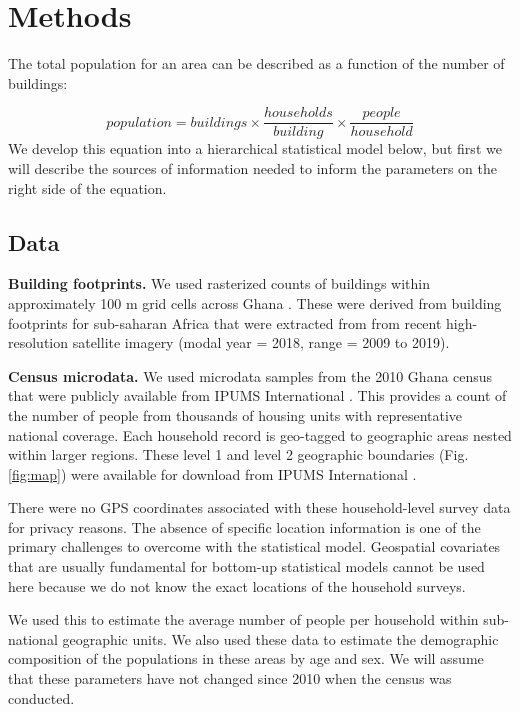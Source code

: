 \documentclass[]{book}
\begin{document}
\section{Methods}\label{methods}

The total population for an area can be described as a function of the
number of buildings:

\[
population = buildings \times \frac{households}{building} \times \frac{people}{household}
\] We develop this equation into a hierarchical statistical model below,
but first we will describe the sources of information needed to inform
the parameters on the right side of the equation.

\subsection{Data}\label{data}

\textbf{Building footprints.} We used rasterized counts of buildings
within approximately 100 m grid cells across Ghana
\citep{dooley2020gridded}. These were derived from building footprints
for sub-saharan Africa that were extracted from from recent
high-resolution satellite imagery \citep{ecopia2020digitize} (modal year
= 2018, range = 2009 to 2019).

\textbf{Census microdata.} We used microdata samples from the 2010 Ghana
census that were publicly available from IPUMS International
\citep{mpc2019integrated}. This provides a count of the number of people
from thousands of housing units with representative national coverage.
Each household record is geo-tagged to geographic areas nested within
larger regions. These level 1 and level 2 geographic boundaries (Fig.
\ref{fig:map}) were available for download from IPUMS International
\citep{mpc2019integrated}.

There were no GPS coordinates associated with these household-level
survey data for privacy reasons. The absence of specific location
information is one of the primary challenges to overcome with the
statistical model. Geospatial covariates that are usually fundamental
for bottom-up statistical models
\citep{wardrop2018spatially, leasure2020national} cannot be used here
because we do not know the exact locations of the household surveys.

We used this to estimate the average number of people per household
within sub-national geographic units. We also used these data to
estimate the demographic composition of the populations in these areas
by age and sex. We will assume that these parameters have not changed
since 2010 when the census was conducted.
\end{document}
